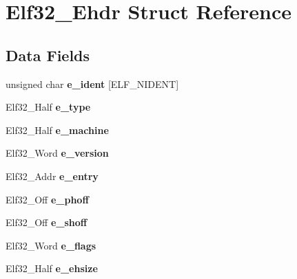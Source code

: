 \hypertarget{structElf32__Ehdr}{}\section{Elf32\+\_\+\+Ehdr Struct Reference}
\label{structElf32__Ehdr}
\subsection*{Data Fields}
\begin{DoxyCompactItemize}
\item 
\mbox{\label{structElf32__Ehdr_afeba6226d3c9c3d72a5415e52fc1b126}} 
unsigned char {\bfseries e\+\_\+ident} \mbox{[}E\+L\+F\+\_\+\+N\+I\+D\+E\+NT\mbox{]}
\item 
\mbox{\label{structElf32__Ehdr_a49e40a791813c06e3b6ebcb53aef1bb8}} 
Elf32\+\_\+\+Half {\bfseries e\+\_\+type}
\item 
\mbox{\label{structElf32__Ehdr_a19bca7faba9e5573814643efc3574c7b}} 
Elf32\+\_\+\+Half {\bfseries e\+\_\+machine}
\item 
\mbox{\label{structElf32__Ehdr_aa27627bda53281221325df4dd782e800}} 
Elf32\+\_\+\+Word {\bfseries e\+\_\+version}
\item 
\mbox{\label{structElf32__Ehdr_ab8a982696048d807017919b7d0145482}} 
Elf32\+\_\+\+Addr {\bfseries e\+\_\+entry}
\item 
\mbox{\label{structElf32__Ehdr_a25c36fc010284a928604aae005b67ad1}} 
Elf32\+\_\+\+Off {\bfseries e\+\_\+phoff}
\item 
\mbox{\label{structElf32__Ehdr_a00601af5187a1b3f8babfe9cddd95c15}} 
Elf32\+\_\+\+Off {\bfseries e\+\_\+shoff}
\item 
\mbox{\label{structElf32__Ehdr_a87cf481be7917fafde0c4ecf78c8e574}} 
Elf32\+\_\+\+Word {\bfseries e\+\_\+flags}
\item 
\mbox{\label{structElf32__Ehdr_a04c658023e50479eed64f6d1b00a2504}} 
Elf32\+\_\+\+Half {\bfseries e\+\_\+ehsize}

\end{DoxyCompactItemize}
